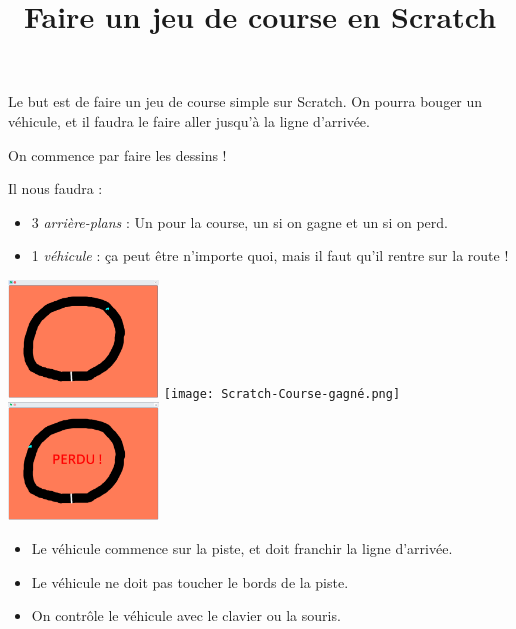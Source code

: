 \documentclass[a4paper,11pt]{article}
\title{Faire un jeu de course en Scratch}
\date{}
\author{}
\theoremstyle{etape_style}
\begin{document}
\maketitle

Le but est de faire un jeu de course simple sur Scratch. On pourra bouger un véhicule, et il faudra le faire aller jusqu'à la ligne d'arrivée.

\begin{greybox}[frametitle={Dessins}]
	On commence par faire les dessins !

	Il nous faudra :
	\begin{itemize}
		\item 3 \textit{arrière-plans} : Un pour la course, un si on gagne et un si on perd.
		\item 1 \textit{véhicule} : ça peut être n'importe quoi, mais il faut qu'il rentre sur la route !
	\end{itemize}
\end{greybox}

\begin{center}
	\includegraphics[width=0.3\textwidth]{Scratch-Course.png}
	\texttt{[image: Scratch-Course-gagné.png]}
	\includegraphics[width=0.3\textwidth]{Scratch-Course-perdu.png}
\end{center}

\begin{greybox}[frametitle={Règles}]
	\begin{itemize}
		\item Le véhicule commence sur la piste, et doit franchir la ligne d'arrivée.
		\item Le véhicule ne doit pas toucher le bords de la piste.
		\item On contrôle le véhicule avec le clavier ou la souris.
	\end{itemize}
\end{greybox}
\end{document}
